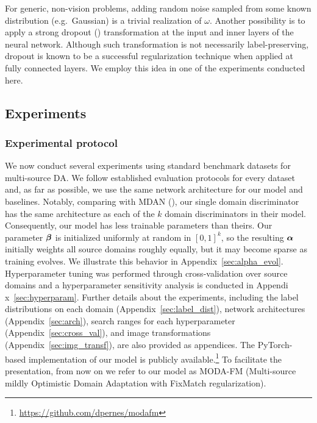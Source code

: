 For generic, non-vision problems, adding random noise sampled from some known distribution (e.g.\ Gaussian) is a trivial realization of $\omega$. Another possibility is to apply a strong dropout (\citet{Srivastava2014}) transformation at the input and inner layers of the neural network. Although such transformation is not necessarily label-preserving, dropout is known to be a successful regularization technique when applied at fully connected layers. We employ this idea in one of the experiments conducted here.

\subsection{Experiments}
\label{sec:modafm_experiments}

\subsubsection{Experimental protocol}
We now conduct several experiments using standard benchmark datasets for multi-source DA. We follow established evaluation protocols for every dataset and, as far as possible, we use the same network architecture for our model and baselines. Notably, comparing with MDAN (\citet{Zhao2018}), our single domain discriminator has the same architecture as each of the $k$ domain discriminators in their model. Consequently, our model has less trainable parameters than theirs. Our parameter ${\bm{\beta}}$ is initialized uniformly at random in $[0,1]^k$, so the resulting ${\bm{\alpha}}$ initially weights all source domains roughly equally, but it may become sparse as training evolves. We illustrate this behavior in Appendix~\ref{sec:alpha_evol}. Hyperparameter tuning was performed through cross-validation over source domains and a hyperparameter sensitivity analysis is conducted in Appendi x~\ref{sec:hyperparam}. Further details about the experiments, including the label distributions on each domain (Appendix~\ref{sec:label_dist}), network architectures (Appendix~\ref{sec:arch}), search ranges for each hyperparameter (Appendix~\ref{sec:cross_val}), and image transformations (Appendix~\ref{sec:img_transf}), are also provided as appendices. The PyTorch-based implementation of our model is publicly available.\footnote{\url{https://github.com/dpernes/modafm}} To facilitate the presentation, from now on we refer to our model as MODA-FM (Multi-source mildly Optimistic Domain Adaptation with FixMatch regularization). 

